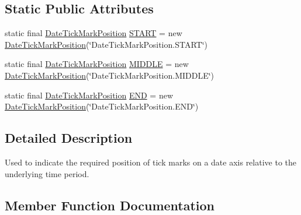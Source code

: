 \subsection*{Static Public Attributes}
\begin{DoxyCompactItemize}
\item 
static final \mbox{\hyperlink{classorg_1_1jfree_1_1chart_1_1axis_1_1_date_tick_mark_position}{Date\+Tick\+Mark\+Position}} \mbox{\hyperlink{classorg_1_1jfree_1_1chart_1_1axis_1_1_date_tick_mark_position_a92d2b57239eec45356930a03a0107dbc}{S\+T\+A\+RT}} = new \mbox{\hyperlink{classorg_1_1jfree_1_1chart_1_1axis_1_1_date_tick_mark_position}{Date\+Tick\+Mark\+Position}}(\char`\"{}Date\+Tick\+Mark\+Position.\+S\+T\+A\+RT\char`\"{})
\item 
static final \mbox{\hyperlink{classorg_1_1jfree_1_1chart_1_1axis_1_1_date_tick_mark_position}{Date\+Tick\+Mark\+Position}} \mbox{\hyperlink{classorg_1_1jfree_1_1chart_1_1axis_1_1_date_tick_mark_position_a48598de9d55d245a060fbddaaebf0738}{M\+I\+D\+D\+LE}} = new \mbox{\hyperlink{classorg_1_1jfree_1_1chart_1_1axis_1_1_date_tick_mark_position}{Date\+Tick\+Mark\+Position}}(\char`\"{}Date\+Tick\+Mark\+Position.\+M\+I\+D\+D\+LE\char`\"{})
\item 
static final \mbox{\hyperlink{classorg_1_1jfree_1_1chart_1_1axis_1_1_date_tick_mark_position}{Date\+Tick\+Mark\+Position}} \mbox{\hyperlink{classorg_1_1jfree_1_1chart_1_1axis_1_1_date_tick_mark_position_ae74a4131448457927e90d88bc82c7631}{E\+ND}} = new \mbox{\hyperlink{classorg_1_1jfree_1_1chart_1_1axis_1_1_date_tick_mark_position}{Date\+Tick\+Mark\+Position}}(\char`\"{}Date\+Tick\+Mark\+Position.\+E\+ND\char`\"{})
\end{DoxyCompactItemize}


\subsection{Detailed Description}
Used to indicate the required position of tick marks on a date axis relative to the underlying time period. 

\subsection{Member Function Documentation}
\mbox{\label{classorg_1_1jfree_1_1chart_1_1axis_1_1_date_tick_mark_position_ab8ffaabf8f0a5cdb6238b8b51e430743}} 
